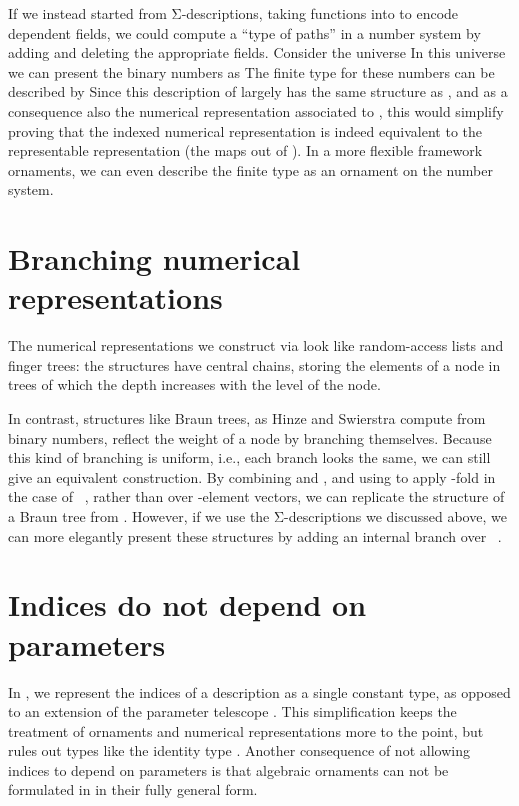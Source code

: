If we instead started from Σ-descriptions, taking functions into  to encode dependent fields, we could compute a ``type of paths'' in a number system by adding and deleting the appropriate fields. Consider the universe
In this universe we can present the binary numbers as
The finite type for these numbers can be described by
Since this description of  largely has the same structure as , and as a consequence also the numerical representation associated to , this would simplify proving that the indexed numerical representation is indeed equivalent to the representable representation (the maps out of ). In a more flexible framework ornaments, we can even describe the finite type as an ornament on the number system.


\section{Branching numerical representations}
The numerical representations we construct via  look like random-access lists and finger trees: the structures have central chains, storing the elements of a node in trees of which the depth increases with the level of the node.

In contrast, structures like Braun trees, as Hinze and Swierstra \cite{calcdata} compute from binary numbers, reflect the weight of a node by branching themselves. Because this kind of branching is uniform, i.e., each branch looks the same, we can still give an equivalent construction. By combining  and , and using 
to apply  -fold in the case of \ , rather than over -element vectors, we can replicate the structure of a Braun tree from . However, if we use the Σ-descriptions we discussed above, we can more elegantly present these structures by adding an internal branch over \ .

\section{Indices do not depend on parameters}\label{sec:no-dep-ix}
In , we represent the indices of a description as a single constant type, as opposed to an extension of the parameter telescope \cite{practgen}. This simplification keeps the treatment of ornaments and numerical representations more to the point, but rules out types like the identity type . Another consequence of not allowing indices to depend on parameters is that algebraic ornaments \cite{algorn} can not be formulated in  in their fully general form.

